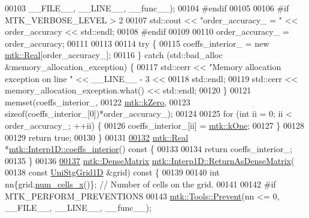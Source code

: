 \begin{DoxyCode}
00103                       \_\_FILE\_\_, \_\_LINE\_\_, \_\_func\_\_);
00104 \textcolor{preprocessor}{  #endif}
00105 
00106 \textcolor{preprocessor}{  #if MTK\_VERBOSE\_LEVEL > 2}
00107   std::cout << \textcolor{stringliteral}{"order\_accuracy\_ = "} << order\_accuracy << std::endl;
00108 \textcolor{preprocessor}{  #endif}
00109 
00110   order\_accuracy\_ = order\_accuracy;
00111 
00113 
00114   \textcolor{keywordflow}{try} \{
00115     coeffs\_interior\_ = \textcolor{keyword}{new} \hyperlink{group__c01-roots_gac080bbbf5cbb5502c9f00405f894857d}{mtk::Real}[order\_accuracy\_];
00116   \} \textcolor{keywordflow}{catch} (std::bad\_alloc &memory\_allocation\_exception) \{
00117     std::cerr << \textcolor{stringliteral}{"Memory allocation exception on line "} << \_\_LINE\_\_ - 3 <<
00118       std::endl;
00119     std::cerr << memory\_allocation\_exception.what() << std::endl;
00120   \}
00121   memset(coeffs\_interior\_,
00122          \hyperlink{group__c01-roots_ga59a451a5fae30d59649bcda274fea271}{mtk::kZero},
00123          \textcolor{keyword}{sizeof}(coeffs\_interior\_[0])*order\_accuracy\_);
00124 
00125   \textcolor{keywordflow}{for} (\textcolor{keywordtype}{int} ii = 0; ii < order\_accuracy\_; ++ii) \{
00126     coeffs\_interior\_[ii] = \hyperlink{group__c01-roots_ga26407c24d43b6b95480943340d285c71}{mtk::kOne};
00127   \}
00128 
00129   \textcolor{keywordflow}{return} \textcolor{keyword}{true};
00130 \}
00131 
\hypertarget{mtk__interp__1d_8cc_source_l00132}{}\hyperlink{classmtk_1_1Interp1D_a652289cbb0000d3f4e5e8d632aaf4b03}{00132} \hyperlink{group__c01-roots_gac080bbbf5cbb5502c9f00405f894857d}{mtk::Real} *\hyperlink{classmtk_1_1Interp1D_a652289cbb0000d3f4e5e8d632aaf4b03}{mtk::Interp1D::coeffs\_interior}()\textcolor{keyword}{ const }\{
00133 
00134   \textcolor{keywordflow}{return} coeffs\_interior\_;
00135 \}
00136 
\hypertarget{mtk__interp__1d_8cc_source_l00137}{}\hyperlink{classmtk_1_1Interp1D_aee8126b8a4be378a30be4d95b43b384b}{00137} \hyperlink{classmtk_1_1DenseMatrix}{mtk::DenseMatrix} \hyperlink{classmtk_1_1Interp1D_aee8126b8a4be378a30be4d95b43b384b}{mtk::Interp1D::ReturnAsDenseMatrix}(
00138   \textcolor{keyword}{const} \hyperlink{classmtk_1_1UniStgGrid1D}{UniStgGrid1D} &grid)\textcolor{keyword}{ const }\{
00139 
00140   \textcolor{keywordtype}{int} nn\{grid.\hyperlink{classmtk_1_1UniStgGrid1D_af1b3729d8afa07be5b2775ed68015b80}{num\_cells\_x}()\}; \textcolor{comment}{// Number of cells on the grid.}
00141 
00142 \textcolor{preprocessor}{  #if MTK\_PERFORM\_PREVENTIONS}
00143   \hyperlink{classmtk_1_1Tools_a332324c6f25e66be9dff48c5987a3b9f}{mtk::Tools::Prevent}(nn <= 0, \_\_FILE\_\_, \_\_LINE\_\_, \_\_func\_\_);

\end{DoxyCode}
